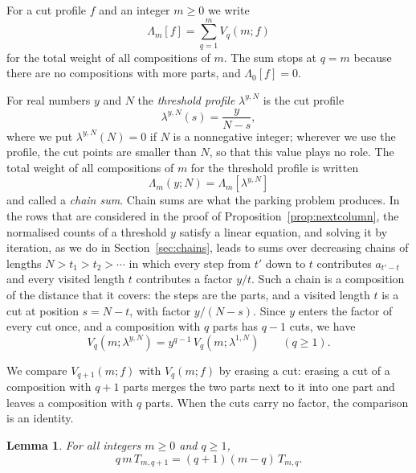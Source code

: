 \documentclass{amsart}
\makeatletter
\newtheorem{lemma}[theorem]{Lemma}
\theoremstyle{definition}
\theoremstyle{remark}
\numberwithin{equation}{section}
\def\subsection{\@startsection{subsection}{2}\z@{.5\linespacing\@plus.7\linespacing}{-.5em}{\normalfont\bfseries\boldmath}}
\makeatother
\begin{document}
For a cut profile $f$ and an integer $m\ge 0$ we write
\[
\Lambda_m[f]=\sum_{q=1}^{m}V_q(m;f)
\]
for the total weight of all compositions of $m$. The sum stops at $q=m$ because there are no compositions with more parts, and $\Lambda_0[f]=0$.

For real numbers $y$ and $N$ the \emph{threshold profile} $\lambda^{y,N}$ is the cut profile
\[
\lambda^{y,N}(s)=\frac{y}{N-s},
\]
where we put $\lambda^{y,N}(N)=0$ if $N$ is a nonnegative integer; wherever we use the profile, the cut points are smaller than $N$, so that this value plays no role. The total weight of all compositions of $m$ for the threshold profile is written
\[
\Lambda_m(y;N)=\Lambda_m[\lambda^{y,N}]
\]
and called a \emph{chain sum}. Chain sums are what the parking problem produces. In the rows that are considered in the proof of Proposition~\ref{prop:nextcolumn}, the normalised counts of a threshold $y$ satisfy a linear equation, and solving it by iteration, as we do in Section~\ref{sec:chains}, leads to sums over decreasing chains of lengths $N>t_1>t_2>\cdots$ in which every step from $t'$ down to $t$ contributes $a_{t'-t}$ and every visited length $t$ contributes a factor $y/t$. Such a chain is a composition of the distance that it covers: the steps are the parts, and a visited length $t$ is a cut at position $s=N-t$, with factor $y/(N-s)$. Since $y$ enters the factor of every cut once, and a composition with $q$ parts has $q-1$ cuts, we have
\begin{equation}\label{eq:comps-scaling}
V_q(m;\lambda^{y,N})=y^{q-1}\,V_q(m;\lambda^{1,N})\qquad(q\ge 1).
\end{equation}

\subsection{Erasing a cut}\label{subsec:comps-erasure}

We compare $V_{q+1}(m;f)$ with $V_q(m;f)$ by erasing a cut: erasing a cut of a composition with $q+1$ parts merges the two parts next to it into one part and leaves a composition with $q$ parts. When the cuts carry no factor, the comparison is an identity.

\begin{lemma}\label{lem:erasure}
For all integers $m\ge 0$ and $q\ge 1$,
\[
q\,m\,T_{m,q+1}=(q+1)(m-q)\,T_{m,q}.
\]
\end{lemma}
\end{document}
